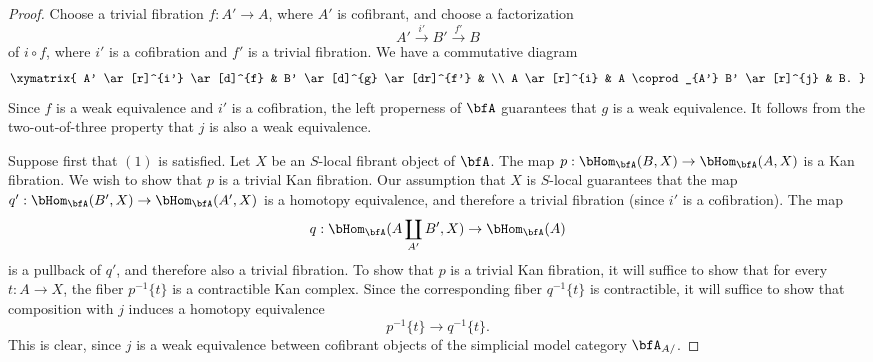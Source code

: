 \begin{Simplicial Categories}
\begin{proof}
Choose a trivial fibration
$f: A' \rightarrow A$, where $A'$ is cofibrant, and choose a factorization
$$ A' \stackrel{i'}{\rightarrow} B' \stackrel{f'}{\rightarrow} B$$ of
$i \circ f$, where $i'$ is a cofibration and $f'$ is a trivial fibration. We have a commutative diagram
$$ \xymatrix{ A' \ar[r]^{i'} \ar[d]^{f} & B' \ar[d]^{g} \ar[dr]^{f'} & \\
A \ar[r]^{i} & A \coprod_{A'} B' \ar[r]^{j} & B. }$$
Since $f$ is a weak equivalence and $i'$ is a cofibration, the left properness of $\bfA$ guarantees that $g$ is a weak equivalence. It follows from the two-out-of-three property that $j$ is also a weak equivalence.

Suppose first that $(1)$ is satisfied. Let $X$ be an $S$-local fibrant object of $\bfA$. 
The map $p: \bHom_{\bfA}(B,X) \rightarrow \bHom_{\bfA}(A,X)$ is a Kan fibration. We wish to show that $p$ is a trivial Kan fibration. Our assumption that $X$ is $S$-local guarantees that the map
$q': \bHom_{\bfA}(B',X) \rightarrow \bHom_{\bfA}(A', X)$ is a homotopy equivalence, and therefore a trivial fibration (since $i'$ is a cofibration). The map
$$q: \bHom_{\bfA}( A \coprod_{A'} B', X) \rightarrow \bHom_{\bfA}(A)$$ is a pullback of $q'$, and therefore also a trivial fibration. To show that $p$ is a trivial Kan fibration, it will suffice to show that
for every $t: A \rightarrow X$, the fiber $p^{-1} \{ t\}$ is a contractible Kan complex. Since the corresponding fiber $q^{-1} \{t\}$ is contractible, it will suffice to show that composition with $j$ induces a homotopy equivalence $$ p^{-1} \{t\} \rightarrow q^{-1} \{t\}. $$
This is clear, since $j$ is a weak equivalence between cofibrant objects of the simplicial model category $\bfA_{A/}$.


\end{proof}
\end{Simplicial Categories}
